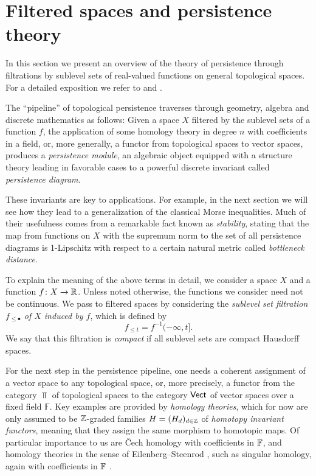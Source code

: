 
\section{Filtered spaces and persistence theory} \label{s:persistence}

In this section we present an overview of the theory of persistence through filtrations by sublevel sets of real-valued functions on general topological spaces.
For a detailed exposition we refer to \cite{Polterovich.2020} and \cite{Chazal.2016a, Oudot.2015}.

The ``pipeline'' of topological persistence traverses through geometry, algebra and discrete mathematics as follows:
Given a space $X$ filtered by the sublevel sets of a function $f$, the application of some homology theory in degree $n$ with coefficients in a field, or, more generally, a functor from topological spaces to vector spaces, produces a \emph{persistence module}, an algebraic object equipped with a structure theory leading in favorable cases to a powerful discrete invariant called \emph{persistence diagram}.

These invariants are key to applications.
For example, in the next section we will see how they lead to a generalization of the classical Morse inequalities.
Much of their usefulness comes from a remarkable fact known as \emph{stability}, stating that the map from functions on $X$ with the supremum norm to the set of all persistence diagrams is 1-Lipschitz with respect to a certain natural metric called \emph{bottleneck distance}.

To explain the meaning of the above terms in detail, we consider a space $X$ and a function $f \colon X \to \mathbb{R}$.
Unless noted otherwise, the functions we consider need not be continuous.
We pass to filtered spaces by considering the \emph{sublevel set filtration $f_{\leq \bullet}$ of $X$ induced by $f$}, which is defined by
\begin{equation*}
f_{\leq t} = f^{-1}(-\infty, t].
\end{equation*}
We say that this filtration is \emph{compact} if all sublevel sets are compact Hausdorff spaces.

For the next step in the persistence pipeline, one needs a coherent assignment of a vector space to any topological space, or, more precisely, a functor from the category $\Top$ of topological spaces to the category $\mathsf{Vect}$ of vector spaces over a fixed field $\mathbb{F}$.
Key examples are provided by \emph{homology theories}, which for now are only assumed to be $\mathbb{Z}$-graded families $H = (H_d)_{d \in \mathbb{Z}}$ of \emph{homotopy invariant functors}, meaning that they assign the same morphism to homotopic maps.
Of particular importance to us are \v{C}ech homology \cite[Section IX--X]{Eilenberg.1952} with coefficients in $\mathbb{F}$, and homology theories in the sense of Eilenberg--Steenrod \cite[Section I]{Eilenberg.1952}, such as singular homology, again with coefficients in $\mathbb{F}$ \cite{Eilenberg.1944}.

